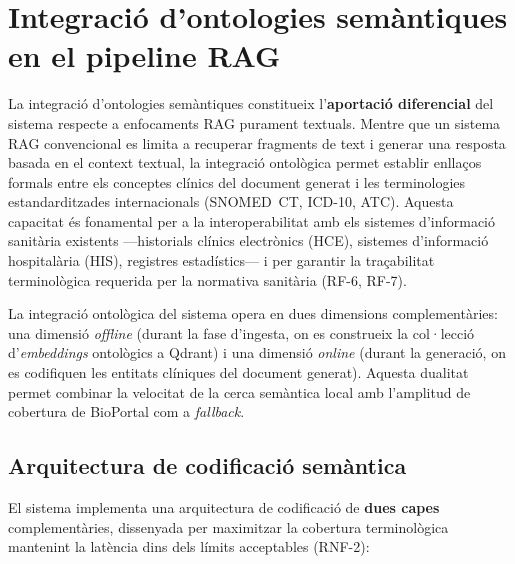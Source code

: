 \documentclass[CAT]{TFUOC}%
\begin{document}
\section{Integració d'ontologies semàntiques en el pipeline RAG}

La integració d'ontologies semàntiques constitueix l'\textbf{aportació diferencial} del sistema respecte a enfocaments RAG purament textuals. Mentre que un sistema RAG convencional es limita a recuperar fragments de text i generar una resposta basada en el context textual, la integració ontològica permet establir enllaços formals entre els conceptes clínics del document generat i les terminologies estandarditzades internacionals (SNOMED~CT, ICD-10, ATC). Aquesta capacitat és fonamental per a la interoperabilitat amb els sistemes d'informació sanitària existents ---historials clínics electrònics (HCE), sistemes d'informació hospitalària (HIS), registres estadístics--- i per garantir la traçabilitat terminològica requerida per la normativa sanitària (RF-6, RF-7).

La integració ontològica del sistema opera en dues dimensions complementàries: una dimensió \textit{offline} (durant la fase d'ingesta, on es construeix la col·lecció d'\textit{embeddings} ontològics a Qdrant) i una dimensió \textit{online} (durant la generació, on es codifiquen les entitats clíniques del document generat). Aquesta dualitat permet combinar la velocitat de la cerca semàntica local amb l'amplitud de cobertura de BioPortal com a \textit{fallback}.

\subsection{Arquitectura de codificació semàntica}

El sistema implementa una arquitectura de codificació de \textbf{dues capes} complementàries, dissenyada per maximitzar la cobertura terminològica mantenint la latència dins dels límits acceptables (RNF-2):
\end{document}
